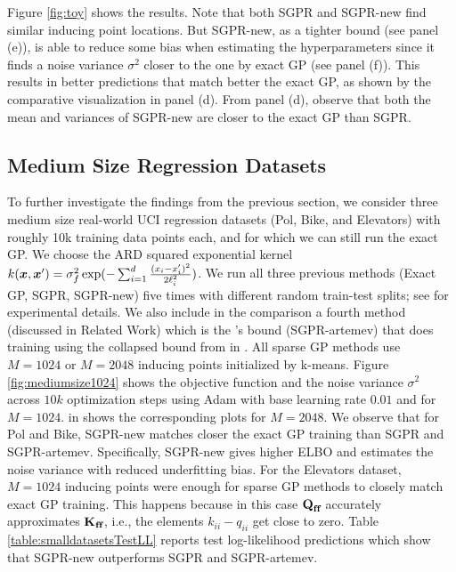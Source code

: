 Figure \ref{fig:toy} shows the results. %
Note that both SGPR and SGPR-new find similar inducing point locations. But SGPR-new,  as a tighter bound (see panel (e)), is able to reduce some bias when estimating
the hyperparameters since it finds a noise variance $\sigma^2$ closer to the one by exact GP (see panel (f)).  
This results in better predictions that match better the exact GP, as shown by the comparative visualization in panel (d). From panel (d), observe that both the mean and variances of SGPR-new are closer to the exact GP than SGPR.  


\subsection{Medium Size Regression Datasets
\label{sec:mediumregress}
}

To further investigate the findings from the previous section, we consider three medium size real-world UCI regression datasets (Pol, Bike, and Elevators)
with roughly 10k training data points each, and for which we can still run the exact GP. We choose the ARD squared exponential kernel $k(\boldsymbol{x}, \boldsymbol{x}') = \sigma_f^2 \exp( - \sum_{i=1}^d \frac{(x_i - x_i')^2}{2 \ell_i^2})$.
We run all three previous methods (Exact GP, SGPR, SGPR-new) five times with different random train-test splits;
see  for experimental details. We also include
in the comparison a fourth method (discussed in Related Work)
which is the \citet{artemevburt2021cglb}'s bound  (SGPR-artemev) that does training using the collapsed bound from  in . 
All sparse GP methods use $M=1024$ or $M=2048$ inducing points initialized by k-means.  Figure \ref{fig:mediumsize1024} shows the objective function and the noise variance $\sigma^2$ across $10k$ optimization steps using Adam with base learning rate $0.01$ and for $M=1024$.   in  shows the corresponding plots for $M=2048$.  We observe that for Pol and Bike, SGPR-new matches closer the exact GP training than SGPR and SGPR-artemev. Specifically, SGPR-new gives higher ELBO and estimates the noise variance with reduced underfitting bias.
For the Elevators dataset, $M=1024$ inducing points were enough for sparse GP methods to closely match exact GP training. This happens because in this case $\textbf{Q}_{\textbf{f} \textbf{f}}$ accurately approximates $\textbf{K}_{\textbf{f} \textbf{f}}$, i.e., the elements $k_{ii} - q_{ii}$ get close to zero. Table \ref{table:smalldatasetsTestLL} reports test log-likelihood predictions which show that 
SGPR-new outperforms SGPR and SGPR-artemev.  

